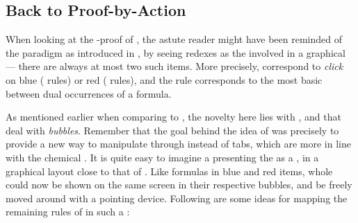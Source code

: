 \begin{scope}
\section{Back to Proof-by-Action}

When looking at the -proof of , the astute reader might
have been reminded of the  paradigm as introduced in
, by seeing redexes as the  involved in a graphical 
--- there are always at most two such items. More precisely, 
correspond to \emph{click}  on blue ({\rnm{\mcirc{-}}} rules) or red
 ({\rnm{\mcirc{+}}} rules), and the {} rule corresponds to
the most basic   between dual occurrences of a formula.

As mentioned earlier when comparing  to , the novelty here lies
with ,  and  that deal
with \emph{bubbles}. Remember that the goal behind the idea of 
was precisely to provide a new way to manipulate  through 
instead of tabs, which are more in line with the chemical . It is quite
easy to imagine a  presenting the  as a , in a graphical
layout close to that of . Like formulas in blue and red
items, whole  could now be shown on the same screen in their respective
bubbles, and be freely moved around with a pointing device. Following are some
ideas for mapping the remaining rules of  in such a :


%   


\end{scope}
